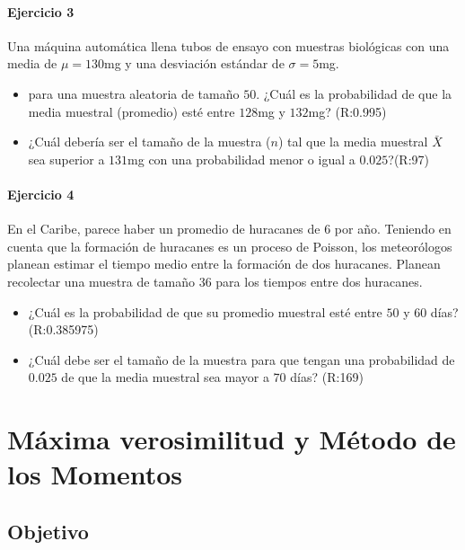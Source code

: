 \documentclass[
]{book}
\begin{document}
\hypertarget{ejercicio-3-5}{%
\subsubsection{Ejercicio 3}\label{ejercicio-3-5}}

Una máquina automática llena tubos de ensayo con muestras biológicas con una media de \(\mu=130\)mg y una desviación estándar de \(\sigma=5\)mg.

\begin{itemize}
\item
  para una muestra aleatoria de tamaño \(50\). ¿Cuál es la probabilidad de que
  la media muestral (promedio) esté entre \(128\)mg y \(132\)mg? (R:0.995)
\item
  ¿Cuál debería ser el tamaño de la muestra (\(n\)) tal que la media muestral \(\bar{X}\) sea superior a \(131\)mg con una probabilidad menor o igual a \(0.025\)?(R:97)
\end{itemize}

\hypertarget{ejercicio-4-3}{%
\subsubsection{Ejercicio 4}\label{ejercicio-4-3}}

En el Caribe, parece haber un promedio de huracanes de \(6\) por año. Teniendo en cuenta que la formación de huracanes es un proceso de Poisson, los meteorólogos planean estimar el tiempo medio entre la formación de dos huracanes. Planean recolectar una muestra de tamaño \(36\) para los tiempos entre dos huracanes.

\begin{itemize}
\item
  ¿Cuál es la probabilidad de que su promedio muestral esté entre \(50\) y \(60\) días? (R:0.385975)
\item
  ¿Cuál debe ser el tamaño de la muestra para que tengan una probabilidad de \(0.025\) de que la media muestral sea mayor a \(70\) días? (R:169)
\end{itemize}

\hypertarget{muxe1xima-verosimilitud-y-muxe9todo-de-los-momentos}{%
\chapter{Máxima verosimilitud y Método de los Momentos}\label{muxe1xima-verosimilitud-y-muxe9todo-de-los-momentos}}

\hypertarget{objetivo-8}{%
\section{Objetivo}\label{objetivo-8}}
\end{document}
